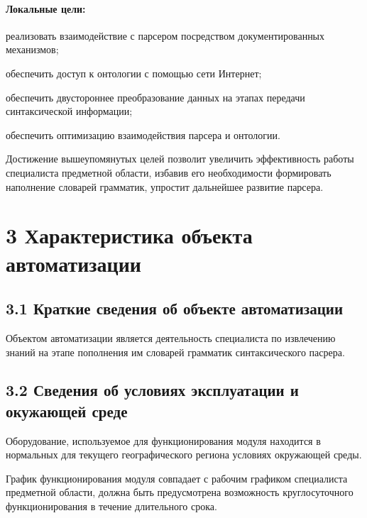 \paragraph{Локальные цели:}
\begin{list}{}{\leftmargin=1.5cm}
  \item реализовать взаимодействие с парсером посредством документированных механизмов;
  \item обеспечить доступ к онтологии с помощью сети Интернет;
  \item обеспечить двустороннее преобразование данных на этапах передачи синтаксической информации;
  \item обеспечить оптимизацию взаимодействия парсера и онтологии.
\end{list}

Достижение вышеупомянутых целей позволит увеличить эффективность работы специалиста предметной области, избавив его необходимости формировать наполнение словарей грамматик, упростит дальнейшее развитие парсера.

\section*{3 Характеристика объекта автоматизации}
\subsection*{3.1 Краткие сведения об объекте автоматизации}
Объектом автоматизации является деятельность специалиста по извлечению знаний на этапе пополнения им словарей грамматик синтаксического пасрера.

\subsection*{3.2 Сведения об условиях эксплуатации и окужающей среде}
Оборудование, используемое для функционирования модуля находится в нормальных для текущего географического
региона условиях окружающей среды.

График функционирования модуля совпадает с рабочим графиком специалиста предметной области, должна быть предусмотрена возможность круглосуточного функционирования в течение длительного срока.

